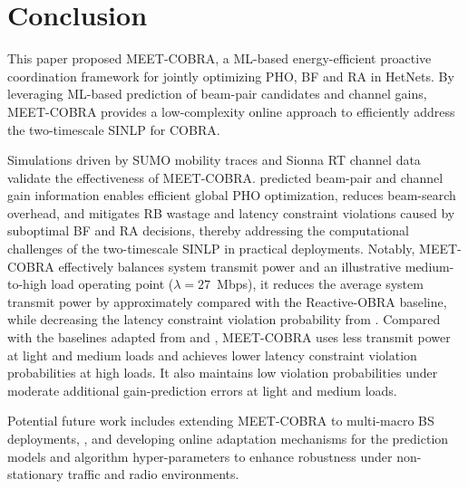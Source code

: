 \documentclass[conference, a4paper]{IEEEtran}
\newcommand{\rev}[1]{\textcolor{revisioncolor}{{}#1}}
\newif\ifshowdeletions
\newcommand{\currentdel}[1]{\ifshowdeletions\textcolor{deletioncolor}{\sout{#1}}\fi}
\theoremstyle{remark}
\begin{document}
\section{Conclusion}

This paper proposed MEET-COBRA, a ML-based energy-efficient proactive coordination framework for jointly optimizing PHO, BF and RA in HetNets.
By leveraging ML-based prediction of beam-pair candidates and channel gains, MEET-COBRA provides a low-complexity online approach to efficiently address the two-timescale SINLP for COBRA.

Simulations driven by SUMO mobility traces and Sionna RT channel data validate the effectiveness of MEET-COBRA.
\currentdel{The ML-driven proactive optimization mechanism delivers substantial gains: the} predicted beam-pair and channel gain information enables efficient global PHO optimization, reduces beam-search overhead, and mitigates RB wastage and latency constraint violations caused by suboptimal BF and RA decisions, thereby addressing the computational challenges of the two-timescale SINLP in practical deployments. 
Notably, MEET-COBRA effectively balances system transmit power and \currentdel{latency reliability}\currentdel{: at} an illustrative medium-to-high load operating point ($\lambda=27$~Mbps), it reduces the average system transmit power by approximately \currentdel{32\%} compared with the Reactive-OBRA baseline, while decreasing the latency constraint violation probability from \currentdel{29.47\% to 0.68\%}.
\rev{Compared with the baselines adapted from \cite{wang2024joint} and \cite{heydarian2025multitimescale}, MEET-COBRA uses less transmit power at light and medium loads and achieves lower latency constraint violation probabilities at high loads.}
\rev{It also maintains low violation probabilities under moderate additional gain-prediction errors at light and medium loads.}

Potential future work includes extending MEET-COBRA to multi-macro BS deployments, \currentdel{incorporating more realistic HO latency and signaling overhead}, and developing online adaptation mechanisms for the prediction models and algorithm hyper-parameters to enhance robustness under non-stationary traffic and radio environments.




\end{document}
